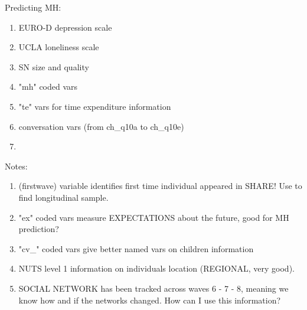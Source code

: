 \documentclass{article}
\begin{document}
Predicting MH:
\begin{enumerate}
    \item EURO-D depression scale
    \item UCLA loneliness scale
    \item SN size and quality
    \item "mh" coded vars 
    \item "te" vars for time expenditure information 
    \item conversation vars (from ch\_q10a to ch\_q10e)
    \item 
\end{enumerate}
Notes:
\begin{enumerate}
    \item (firstwave) variable identifies first time individual appeared in SHARE! Use to find longitudinal sample.
    \item "ex" coded vars measure EXPECTATIONS about the future, good for MH prediction?
    \item "cv\_" coded vars give better named vars on children information
    \item NUTS level 1 information on individuals location (REGIONAL, very good).
    \item SOCIAL NETWORK has been tracked across waves 6 - 7 - 8, meaning we know how and if the networks changed. How can I use this information?
\end{enumerate}
\end{document}
